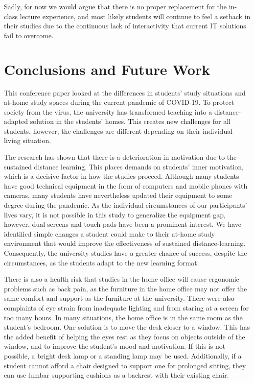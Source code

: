 \documentclass{sigchi}
\begin{document}
Sadly, for now we would argue that there is no proper replacement for the in-class lecture experience, and most likely students will continue to feel a setback in their studies due to the continuous lack of interactivity that current IT solutions fail to overcome.

\section{Conclusions and Future Work}

This conference paper looked at the differences in students' study situations and at-home study spaces during the current pandemic of COVID-19. To protect society from the virus, the university has transformed teaching into a distance-adapted solution in the students' homes. This creates new challenges for all students, however, the challenges are different depending on their individual living situation. 

The research has shown that there is a deterioration in motivation due to the sustained distance learning. This places demands on students' inner motivation, which is a decisive factor in how the studies proceed. Although many students have good technical equipment in the form of computers and mobile phones with cameras, many students have nevertheless updated their equipment to some degree during the pandemic. As the individual circumstances of our participants' lives vary, it is not possible in this study to generalize the equipment gap, however, dual screens and touch-pads have been a prominent interest. We have identified simple changes a student could make to their at-home study environment that would improve the effectiveness of sustained distance-learning. Consequently, the university studies have a greater chance of success, despite the circumstances, as the students adapt to the new learning format. 

There is also a health risk that studies in the home office will cause ergonomic problems such as back pain, as the furniture in the home office may not offer the same comfort and support as the furniture at the university. There were also complaints of eye strain from inadequate lighting and from staring at a screen for too many hours. In many situations, the home office is in the same room as the student's bedroom. One solution is to move the desk closer to a window. This has the added benefit of helping the eyes rest as they focus on objects outside of the window, and to improve the student's mood and motivation. If this is not possible, a bright desk lamp or a standing lamp may be used. Additionally, if a student cannot afford a chair designed to support one for prolonged sitting, they can use lumbar supporting cushions as a backrest with their existing chair. 
\end{document}
